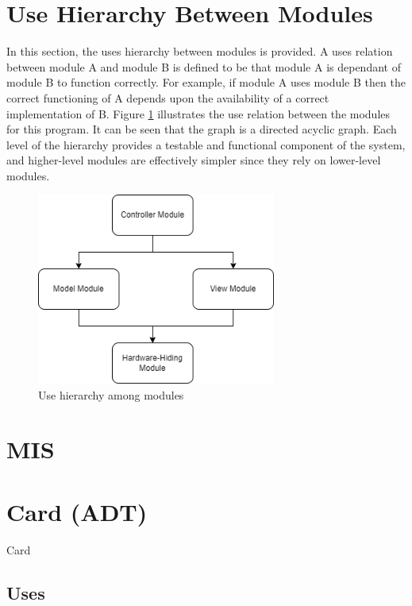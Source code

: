 \documentclass[12pt, titlepage]{article}
\begin{document}
\section{Use Hierarchy Between Modules} \label{SecUse}

In this section, the uses hierarchy between modules is
provided. A uses relation between module A and module B is defined to be that module A is dependant of module B to function correctly. For example, if module A uses module B then the correct functioning of A depends upon the availability of a correct
implementation of B. Figure \ref{FigUH} illustrates the use relation between
the modules for this program. It can be seen that the graph is a directed acyclic graph. Each level of the hierarchy provides a testable and functional component of the system, and higher-level modules are effectively simpler since they rely on lower-level modules.

\begin{figure}[H]
\centering
\includegraphics[width=0.7\textwidth]{Poker_UseDiagram.png}
\caption{Use hierarchy among modules}
\label{FigUH}
\end{figure}

\section{MIS}

\section* {Card (ADT)}

Card

\subsection* {Uses}
\end{document}

